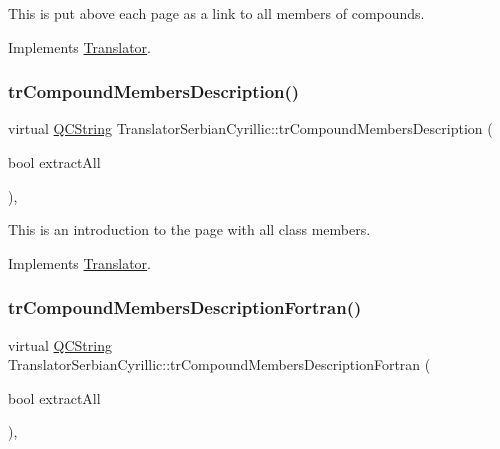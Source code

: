 This is put above each page as a link to all members of compounds. 

Implements \mbox{\hyperlink{class_translator}{Translator}}.

\mbox{\label{class_translator_serbian_cyrillic_a45d3d0417606052c403675e8f4eb1706}} 
\subsubsection{\texorpdfstring{trCompoundMembersDescription()}{trCompoundMembersDescription()}}
{\footnotesize\ttfamily virtual \mbox{\hyperlink{class_q_c_string}{Q\+C\+String}} Translator\+Serbian\+Cyrillic\+::tr\+Compound\+Members\+Description (\begin{DoxyParamCaption}\item[{bool}]{extract\+All }\end{DoxyParamCaption})\hspace{0.3cm}{\ttfamily [inline]}, {\ttfamily [virtual]}}

This is an introduction to the page with all class members. 

Implements \mbox{\hyperlink{class_translator}{Translator}}.

\mbox{\label{class_translator_serbian_cyrillic_a8331ad7b47ba949ad9f7540c63d954c0}} 
\subsubsection{\texorpdfstring{trCompoundMembersDescriptionFortran()}{trCompoundMembersDescriptionFortran()}}
{\footnotesize\ttfamily virtual \mbox{\hyperlink{class_q_c_string}{Q\+C\+String}} Translator\+Serbian\+Cyrillic\+::tr\+Compound\+Members\+Description\+Fortran (\begin{DoxyParamCaption}\item[{bool}]{extract\+All }\end{DoxyParamCaption})\hspace{0.3cm}{\ttfamily [inline]}, {\ttfamily [virtual]}}

